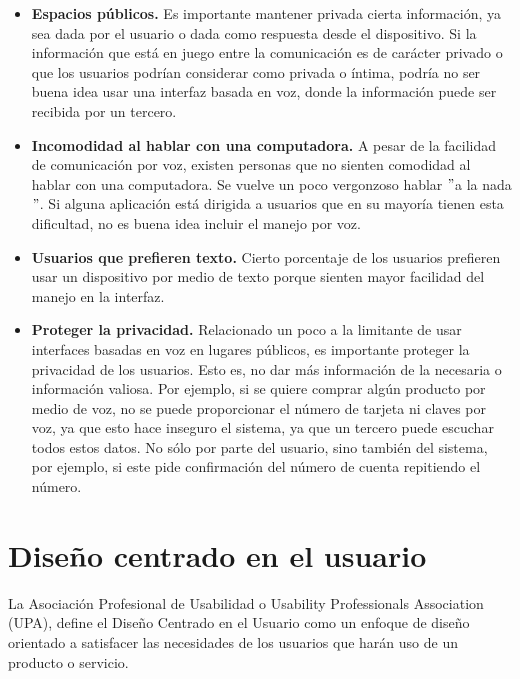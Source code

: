 \begin{itemize}
  \item \textbf{Espacios públicos.} Es importante mantener privada cierta información, ya sea dada por el usuario o dada como respuesta desde el dispositivo. Si la información que está en juego entre la comunicación es de carácter privado o que los usuarios podrían considerar como privada o íntima, podría no ser buena idea usar una interfaz basada en voz, donde la información puede ser recibida por un tercero.
  \item \textbf{Incomodidad al hablar con una computadora.} A pesar de la facilidad de comunicación por voz, existen personas que no sienten comodidad al hablar con una computadora. Se vuelve un poco vergonzoso hablar $"$a la nada$"$. Si alguna aplicación está dirigida a usuarios que en su mayoría tienen esta dificultad, no es buena idea incluir el manejo por voz.
  \item \textbf{Usuarios que prefieren texto.} Cierto porcentaje de los usuarios prefieren usar un dispositivo por medio de texto porque sienten mayor facilidad del manejo en la interfaz.
  \item \textbf{Proteger la privacidad.} Relacionado un poco a la limitante de usar interfaces basadas en voz en lugares públicos, es importante proteger la privacidad de los usuarios. Esto es, no dar más información de la necesaria o información valiosa. Por ejemplo, si se quiere comprar algún producto por medio de voz, no se puede proporcionar el número de tarjeta ni claves por voz, ya que esto hace inseguro el sistema, ya que un tercero puede escuchar todos estos datos. No sólo por parte del usuario, sino también del sistema, por ejemplo, si este pide confirmación del número de cuenta repitiendo el número.
\end{itemize}


\section{Diseño centrado en el usuario}
\label{DisenioCentradoUsuarioCap3}

La Asociación Profesional de Usabilidad o Usability Professionals Association (UPA), define el Diseño Centrado en el Usuario como un enfoque de diseño orientado a satisfacer las necesidades de los usuarios que harán uso de un producto o servicio.

